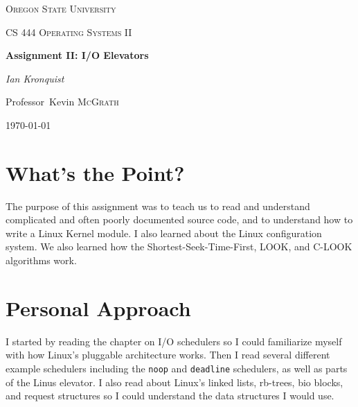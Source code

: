 \documentclass[10pt,conference,draftclsnofoot,onecolumn]{IEEEtran}
\begin{document}
\begin{titlepage}
    \centering
    {\scshape\LARGE Oregon State University \par}
    \vspace{1cm}
    {\scshape\Large CS 444 Operating Systems II\par}
    \vspace{1.5cm}
    {\huge\bfseries Assignment II: I/O Elevators\par}
    \vspace{2cm}
    {\Large\itshape Ian Kronquist\par}
    \vfill
    \par
    Professor~Kevin \textsc{McGrath}

    \vfill

    {\large \today\par}
\end{titlepage}


\author{
}


\begin{abstract}
In this project I studied various I/O schedulers in the Linux Kernel source code so I could implement a scheduler which uses the C-LOOK algorithm.

\end{abstract}

\bigskip
\bigskip
\bigskip

\section{What's the Point?}
The purpose of this assignment was to teach us to read and understand complicated and often poorly documented source code, and to understand how to write a Linux Kernel module. I also learned about the Linux configuration system. We also learned how the Shortest-Seek-Time-First, LOOK, and C-LOOK algorithms work.
\section{Personal Approach}
I started by reading the chapter on I/O schedulers so I could familiarize myself with how Linux's pluggable architecture works. Then I read several different example schedulers including the \texttt{noop} and \texttt{deadline} schedulers, as well as parts of the Linus elevator. I also read about Linux's linked lists, rb-trees, bio blocks, and request structures so I could understand the data structures I would use.
\end{document}
